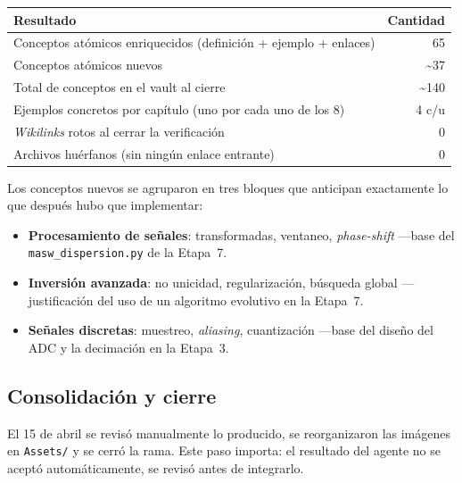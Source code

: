 \begin{center}\small
\begin{tabularx}{\textwidth}{@{}X r@{}}
\toprule
\textbf{Resultado} & \textbf{Cantidad} \\
\midrule
Conceptos at\'omicos enriquecidos (definici\'on + ejemplo + enlaces) & 65 \\
Conceptos at\'omicos nuevos & \textasciitilde{}37 \\
Total de conceptos en el vault al cierre & \textasciitilde{}140 \\
Ejemplos concretos por cap\'itulo (uno por cada uno de los 8) & 4 c/u \\
\emph{Wikilinks} rotos al cerrar la verificaci\'on & 0 \\
Archivos hu\'erfanos (sin ning\'un enlace entrante) & 0 \\
\bottomrule
\end{tabularx}
\end{center}

Los conceptos nuevos se agruparon en tres bloques que anticipan exactamente lo
que despu\'es hubo que implementar:

\begin{itemize}[itemsep=0.2em]
\item \textbf{Procesamiento de se\~nales}: transformadas, ventaneo,
\emph{phase-shift} ---base del \texttt{masw\_dispersion.py} de la Etapa~7.
\item \textbf{Inversi\'on avanzada}: no unicidad, regularizaci\'on, b\'usqueda
global ---justificaci\'on del uso de un algoritmo evolutivo en la Etapa~7.
\item \textbf{Se\~nales discretas}: muestreo, \emph{aliasing}, cuantizaci\'on
---base del dise\~no del ADC y la decimaci\'on en la Etapa~3.
\end{itemize}

\subsection{Consolidaci\'on y cierre}

El 15 de abril se revis\'o manualmente lo producido, se reorganizaron las
im\'agenes en \texttt{Assets/} y se cerr\'o la rama. Este paso importa: el
resultado del agente no se acept\'o autom\'aticamente, se revis\'o antes de
integrarlo.


